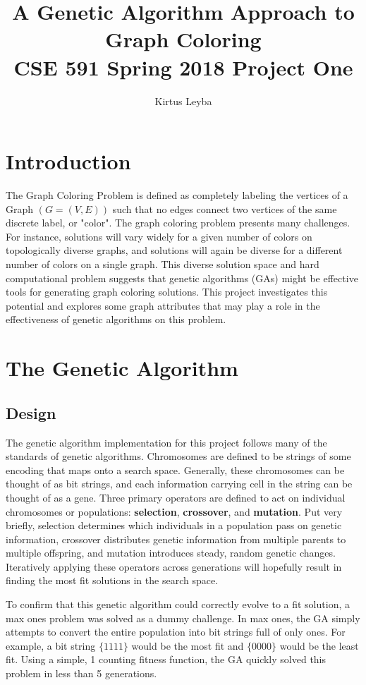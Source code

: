 \documentclass{article}
\title{A Genetic Algorithm Approach to Graph Coloring \\
       \large CSE 591 Spring 2018 Project One}
\author{Kirtus Leyba}
\begin{document}
\maketitle

\section{Introduction}

    The Graph Coloring Problem is defined as completely labeling the vertices of a Graph $(G = (V,E))$ such that no edges connect two vertices of the same discrete label, or "color". The graph coloring problem presents many challenges. For instance, solutions will vary widely for a given number of colors on topologically diverse graphs, and solutions will again be diverse for a different number of colors on a single graph. This diverse solution space and hard computational problem suggests that genetic algorithms (GAs) might be effective tools for generating graph coloring solutions. This project investigates this potential and explores some graph attributes that may play a role in the effectiveness of genetic algorithms on this problem.

\section{The Genetic Algorithm}

	\subsection{Design}
	The genetic algorithm implementation for this project follows many of the standards of genetic algorithms. Chromosomes are defined to be strings of some encoding that maps onto a search space. Generally, these chromosomes can be thought of as bit strings, and each information carrying cell in the string can be thought of as a gene. Three primary operators are defined to act on individual chromosomes or populations: \textbf{selection}, \textbf{crossover}, and \textbf{mutation}. Put very briefly, selection determines which individuals in a population pass on genetic information, crossover distributes genetic information from multiple parents to multiple offspring, and mutation introduces steady, random genetic changes. Iteratively applying these operators across generations will hopefully result in finding the most fit solutions in the search space.\par

	To confirm that this genetic algorithm could correctly evolve to a fit solution, a max ones problem was solved as a dummy challenge. In max ones, the GA simply attempts to convert the entire population into bit strings full of only ones. For example, a bit string $\{1111\}$ would be the most fit and $\{0000\}$ would be the least fit. Using a simple, 1 counting fitness function, the GA quickly solved this problem in less than 5 generations.
\end{document}
